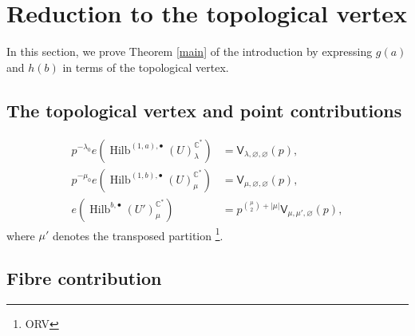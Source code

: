 \documentclass{amsart}
\theoremstyle{definition}
\newcommand{\CC} {\mathbb{C}}          %
\newcommand{\sfV}{\mathsf{V}}
\newcommand{\Hilb}{\operatorname{Hilb}}
\begin{document}
   
\section{Reduction to the topological vertex}  \label{vertex} 

In this section, we prove Theorem \ref{main} of the introduction by expressing $g(a)$ and $h(b)$ in terms of the topological vertex. 

\subsection{The topological vertex and point contributions}   


\begin{align*}
p^{-\lambda_0} e(\Hilb^{(1,a),\bullet}(U)_{\lambda}^{\CC^*}) &= \sfV_{\lambda,\varnothing,\varnothing}(p), \\
p^{-\mu_0} e(\Hilb^{(1,b),\bullet}(U)_{\mu}^{\CC^*}) &= \sfV_{\mu,\varnothing,\varnothing}(p), \\
e(\Hilb^{b,\bullet}(U')_{\mu}^{\CC^*}) &= p^{\binom{\mu}{2} + |\mu|} \sfV_{\mu,\mu',\varnothing}(p),
\end{align*}
where $\mu'$ denotes the transposed partition \footnote{ORV}.

   
\subsection{Fibre contribution}
\end{document}

